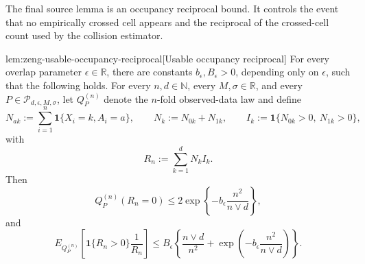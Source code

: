 \documentclass[11pt]{article}
\begin{document}
The final source lemma is an occupancy reciprocal bound. It controls the event that no empirically crossed cell appears and the reciprocal of the crossed-cell count used by the collision estimator.

\begin{lemmav}{lem:zeng-usable-occupancy-reciprocal}[Usable occupancy reciprocal]
For every overlap parameter \(\epsilon\in\mathbb R\), there are constants
\(b_{\epsilon},B_{\epsilon}>0\), depending only on \(\epsilon\), such that the following holds.
For every \(n,d\in\mathbb N\), every \(M,\sigma\in\mathbb R\), and every
\(P\in\mathcal P_{d,\epsilon,M,\sigma}\), let \(Q_P^{(n)}\) denote the \(n\)-fold observed-data law and define
\[
N_{ak}:=\sum_{i=1}^n \mathbf 1\{X_i=k,A_i=a\},\qquad
N_k:=N_{0k}+N_{1k},\qquad
I_k:=\mathbf 1\{N_{0k}>0,\ N_{1k}>0\},
\]
with
\[
R_n:=\sum_{k=1}^d N_k I_k .
\]
Then
\[
Q_P^{(n)}(R_n=0)
\le
2\exp\left\{-b_{\epsilon}\frac{n^2}{n\vee d}\right\},
\]
and
\[
E_{Q_P^{(n)}}\left[
\mathbf 1\{R_n>0\}\frac{1}{R_n}
\right]
\le
B_{\epsilon}\left\{
\frac{n\vee d}{n^2}
+
\exp\left(-b_{\epsilon}\frac{n^2}{n\vee d}\right)
\right\}.
\]
\end{lemmav}
\end{document}
